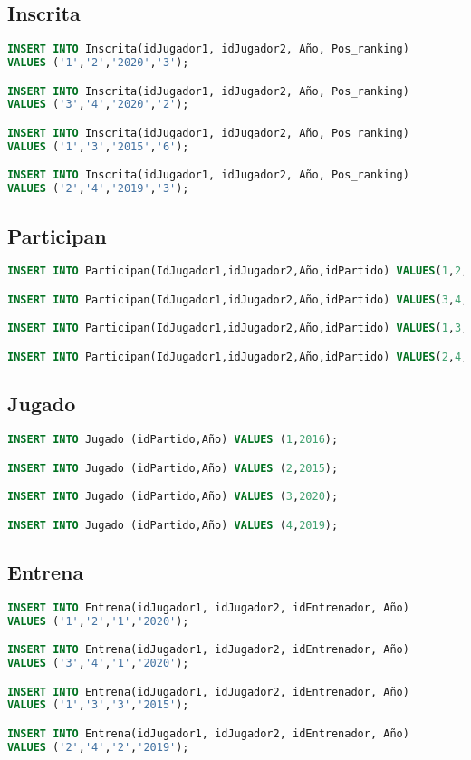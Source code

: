 \pagebreak

\subsection{Inscrita}
\begin{lstlisting}[language=sql]
INSERT INTO Inscrita(idJugador1, idJugador2, Año, Pos_ranking)
VALUES ('1','2','2020','3');

INSERT INTO Inscrita(idJugador1, idJugador2, Año, Pos_ranking)
VALUES ('3','4','2020','2');

INSERT INTO Inscrita(idJugador1, idJugador2, Año, Pos_ranking)
VALUES ('1','3','2015','6');

INSERT INTO Inscrita(idJugador1, idJugador2, Año, Pos_ranking)
VALUES ('2','4','2019','3');
\end{lstlisting}

\subsection{Participan}
\begin{lstlisting}[language=sql]
INSERT INTO Participan(IdJugador1,idJugador2,Año,idPartido) VALUES(1,2,2020,2);

INSERT INTO Participan(IdJugador1,idJugador2,Año,idPartido) VALUES(3,4,2020,1);

INSERT INTO Participan(IdJugador1,idJugador2,Año,idPartido) VALUES(1,3,2015,3);

INSERT INTO Participan(IdJugador1,idJugador2,Año,idPartido) VALUES(2,4,2019,4);
\end{lstlisting}

\subsection{Jugado}
\begin{lstlisting}[language=sql]
INSERT INTO Jugado (idPartido,Año) VALUES (1,2016);

INSERT INTO Jugado (idPartido,Año) VALUES (2,2015);

INSERT INTO Jugado (idPartido,Año) VALUES (3,2020);

INSERT INTO Jugado (idPartido,Año) VALUES (4,2019);
\end{lstlisting}

\subsection{Entrena}
\begin{lstlisting}[language=sql]
INSERT INTO Entrena(idJugador1, idJugador2, idEntrenador, Año)
VALUES ('1','2','1','2020');

INSERT INTO Entrena(idJugador1, idJugador2, idEntrenador, Año)
VALUES ('3','4','1','2020');

INSERT INTO Entrena(idJugador1, idJugador2, idEntrenador, Año)
VALUES ('1','3','3','2015');

INSERT INTO Entrena(idJugador1, idJugador2, idEntrenador, Año)
VALUES ('2','4','2','2019');
\end{lstlisting}

